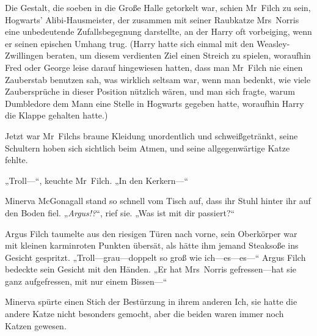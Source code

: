 Die Gestalt, die soeben in die Große Halle getorkelt war, schien Mr~Filch zu sein, Hogwarts’ Alibi-Hausmeister, der zusammen mit seiner Raubkatze Mrs~Norris eine unbedeutende Zufallsbegegnung darstellte, an der Harry oft vorbeiging, wenn er seinen epischen Umhang trug. (Harry hatte sich einmal mit den Weasley-Zwillingen beraten, um diesem verdienten Ziel einen Streich zu spielen, woraufhin Fred oder George leise darauf hingewiesen hatten, dass man Mr~Filch nie einen Zauberstab benutzen sah, was wirklich seltsam war, wenn man bedenkt, wie viele Zaubersprüche in dieser Position nützlich wären, und man sich fragte, warum Dumbledore dem Mann eine Stelle in Hogwarts gegeben hatte, woraufhin Harry die Klappe gehalten hatte.)

Jetzt war Mr~Filchs braune Kleidung unordentlich und schweißgetränkt, seine Schultern hoben sich sichtlich beim Atmen, und seine allgegenwärtige Katze fehlte.

„Troll—“, keuchte Mr~Filch.
„In den Kerkern—“

\later


Minerva McGonagall stand so schnell vom Tisch auf, dass ihr Stuhl hinter ihr auf den Boden fiel.
„\emph{Argus!?}“, rief sie.
„Was ist mit dir passiert?“

Argus Filch taumelte aus den riesigen Türen nach vorne, sein Oberkörper war mit kleinen karminroten Punkten übersät, als hätte ihm jemand Steaksoße ins Gesicht gespritzt.
„Troll—grau—doppelt so groß wie ich—es—es—“ Argus Filch bedeckte sein Gesicht mit den Händen.
„Er hat Mrs~Norris gefressen—hat sie ganz aufgefressen, mit nur einem Bissen—“

Minerva spürte einen Stich der Bestürzung in ihrem anderen Ich, sie hatte die andere Katze nicht besonders gemocht, aber die beiden waren immer noch Katzen gewesen.

